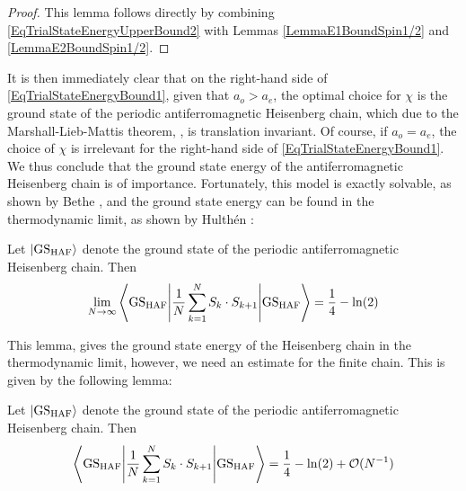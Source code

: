 \begin{proof}
	This lemma follows directly by combining \eqref{EqTrialStateEnergyUpperBound2} with Lemmas \ref{LemmaE1BoundSpin1/2} and \ref{LemmaE2BoundSpin1/2}.
\end{proof}
It is then immediately clear that on the right-hand side of \eqref{EqTrialStateEnergyBound1}, given that $ a_o>a_e $, the optimal choice for $ \chi $ is the ground state of the periodic antiferromagnetic Heisenberg chain, which due to the Marshall-Lieb-Mattis theorem, \cite{lieb1962ordering,marshall1955antiferromagnetism}, is translation invariant. Of course, if $ a_o=a_e $, the choice of $ \chi $ is irrelevant for the right-hand side of \eqref{EqTrialStateEnergyBound1}. \\
We thus conclude that the ground state energy of the antiferromagnetic Heisenberg chain is of importance. Fortunately, this model is exactly solvable, as shown by Bethe \cite{bethe1931theorie}, and the ground state energy can be found in the thermodynamic limit, as shown by Hulthén \cite{hult1938}: \begin{lemma}\label{LemmaHeisenbergChainThermodynamicGSEnergy}
Let $ \ket{\textnormal{GS}_{\textnormal{HAF}}} $ denote the ground state of the periodic antiferromagnetic Heisenberg chain. Then\begin{equation}
\lim\limits_{N\to\infty}\left\langle\textnormal{GS}_{\textnormal{HAF}}\Bigg\vert\frac{1}{N}\sum_{k=1}^N S_k\cdot S_{k+1} \Bigg\vert \textnormal{GS}_{\textnormal{HAF}}\right\rangle=\frac{1}{4}-\ln(2) 
\end{equation}
\end{lemma}
This lemma, gives the ground state energy of the Heisenberg chain in the thermodynamic limit, however, we need an estimate for the finite chain. This is given by the following lemma:
\begin{lemma}\label{LemmaHeisenbergChainFiniteNEstimate}
	Let $ \ket{\textnormal{GS}_{\textnormal{HAF}}} $ denote the ground state of the periodic antiferromagnetic Heisenberg chain. Then\begin{equation}
	\left\langle\textnormal{GS}_{\textnormal{HAF}}\Bigg\vert\frac{1}{N}\sum_{k=1}^N S_k\cdot S_{k+1} \Bigg\vert \textnormal{GS}_{\textnormal{HAF}}\right\rangle=\frac{1}{4}-\ln(2) +\mathcal{O}(N^{-1})
	\end{equation}
\end{lemma}
